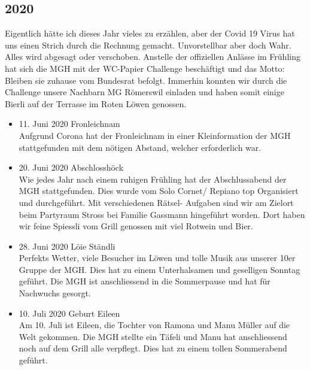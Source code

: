 \subsection*{2020}
\begin{history}

    Eigentlich hätte ich dieses Jahr vieles zu erzählen, aber der Covid 19 Virus
    hat uns einen Strich durch die Rechnung gemacht. Unvorstellbar aber doch
    Wahr. Alles wird abgesagt oder verschoben. Anstelle der offiziellen Anlässe
    im Frühling hat sich die MGH mit der WC-Papier Challenge beschäftigt und das
    Motto: Bleiben sie zuhause vom Bundesrat befolgt. Immerhin konnten wir durch
    die Challenge unsere Nachbarn MG Römerswil einladen und haben somit einige
    Bierli auf der Terrasse im Roten Löwen genossen.

    \begin{itemize}

        \item 11. Juni 2020 Fronleichnam\\
              Aufgrund Corona hat der Fronleichnam in einer Kleinformation der
              MGH stattgefunden mit dem nötigen Abstand, welcher erforderlich
              war.

        \item 20. Juni 2020 Abschlosshöck\\
              Wie jedes Jahr nach einem ruhigen Frühling hat der Abschlussabend
              der MGH stattgefunden. Dies wurde vom Solo Cornet/ Repiano top
              Organisiert und durchgeführt. Mit verschiedenen Rätsel- Aufgaben
              sind wir am Zielort beim Partyraum Stross bei Familie Gassmann
              hingeführt worden. Dort haben wir feine Spiessli vom Grill
              genossen mit viel Rotwein und Bier.

        \item 28. Juni 2020 Löie Ständli\\
              Perfekts Wetter, viele Besucher im Löwen und tolle Musik aus
              unserer 10er Gruppe der MGH. Dies hat zu einem Unterhalsamen und
              geselligen Sonntag geführt. Die MGH ist anschliessend in die
              Sommerpause und hat für Nachwuchs gesorgt.

        \item 10. Juli 2020 Geburt Eileen\\
              Am 10. Juli ist Eileen, die Tochter von Ramona und Manu Müller auf
              die Welt gekommen. Die MGH stellte ein Täfeli und Manu hat
              anschliessend noch auf dem Grill alle verpflegt. Dies hat zu einem
              tollen Sommerabend geführt.


\end{itemize}
\end{history}
